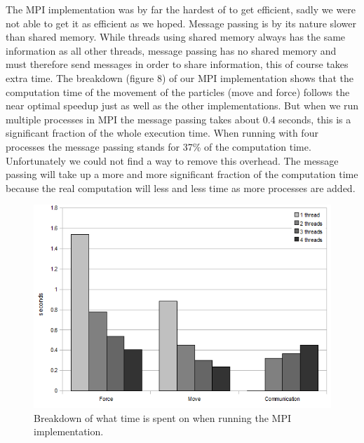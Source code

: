 The MPI implementation was by far the hardest of to get efficient, sadly we
were not able to get it as efficient as we hoped. Message passing is by its
nature slower than shared memory. While threads using shared memory always has
the same information as all other threads, message passing has no shared memory
and must therefore send messages in order to share information, this of course
takes extra time. The breakdown (figure 8) of our MPI implementation shows that
the computation time of the movement of the particles (move and force) follows
the near optimal speedup just as well as the other implementations. But when we
run multiple processes in MPI the message passing takes about 0.4 seconds, this
is a significant fraction of the whole execution time. When running with four
processes the message passing stands for 37\% of the computation time.
Unfortunately we could not find a way to remove this overhead. The message
passing will take up a more and more significant fraction of the computation
time because the real computation will less and less time as more processes are
added.

\begin{figure}[H]
    \label{breakdown}
	\includegraphics[width=\textwidth]{mpilol}
	\caption{Breakdown of what time is spent on when running the MPI
    implementation.}
\end{figure}
